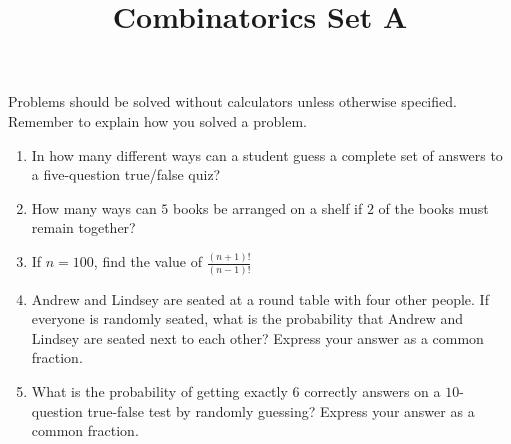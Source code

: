 \documentclass{article}
\title{Combinatorics Set A}
\author{}
\date{}
\begin{document}
\maketitle
\noindent Problems should be solved without calculators unless otherwise 
specified. Remember to explain how you solved a problem.
\begin{enumerate}
    \item In how many different ways can a student guess a complete set of 
        answers to a five-question true/false quiz?
        \vspace{3cm}
    \item How many ways can $5$ books be arranged on a shelf if $2$ of the books 
        must remain together?
        \vspace{3cm}
    \item If $n = 100$, find the value of $\frac{(n+1)!}{(n-1)!}$
        \vspace{3cm}
    \item Andrew and Lindsey are seated at a round table with four other people.  
        If everyone is randomly seated, what is the probability that Andrew and 
        Lindsey are seated next to each other? Express your answer as a common 
        fraction.
        \vspace{3cm}
    \item What is the probability of getting exactly $6$ correctly answers on a  
        $10$-question true-false test by randomly guessing? Express your answer 
        as a common fraction.
        \vspace{3cm}
\end{enumerate}
\end{document}
